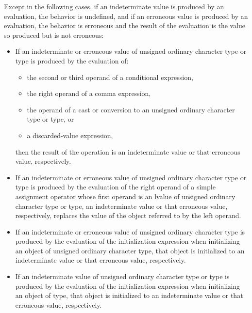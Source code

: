 \pnum
Except in the following cases,
if an indeterminate value is produced by an evaluation,
the behavior is undefined, and
if an erroneous value is produced by an evaluation,
the behavior is erroneous and
the result of the evaluation is the value so produced but is not erroneous:
\begin{itemize}
\item
  If an indeterminate or erroneous value of
  unsigned ordinary character type
  or  type
  is produced by the evaluation of:
  \begin{itemize}
  \item
    the second or third operand of a conditional expression,
  \item
    the right operand of a comma expression,
  \item
    the operand of a cast or conversion
    to an unsigned ordinary character type
    or  type, or
  \item
    a discarded-value expression,
  \end{itemize}
  then the result of the operation is an indeterminate value or
  that erroneous value, respectively.
\item
  If an indeterminate or erroneous value of
  unsigned ordinary character type or  type
  is produced by the evaluation of
  the right operand of a simple assignment operator
  whose first operand is an lvalue of
  unsigned ordinary character type or  type,
  an indeterminate value or that erroneous value, respectively, replaces
  the value of the object referred to by the left operand.
\item
  If an indeterminate or erroneous value of unsigned ordinary character type
  is produced by the evaluation of the initialization expression
  when initializing an object of unsigned ordinary character type,
  that object is initialized to an indeterminate
  value or that erroneous value, respectively.
\item
  If an indeterminate value of
  unsigned ordinary character type or  type
  is produced by the evaluation of the initialization expression
  when initializing an object of  type,
  that object is initialized to an indeterminate value or
  that erroneous value, respectively.
\end{itemize}
